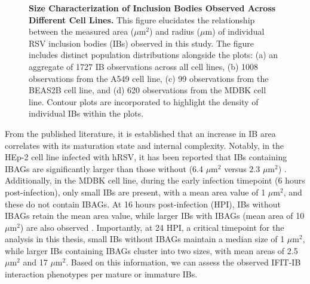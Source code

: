 \begin{figure}
\begin{subfigure}{0.495\textwidth}
    \end{subfigure}
    \caption[Size Characterization of Inclusion Bodies Observed Across Different Cell Lines.]{\textbf{Size Characterization of Inclusion Bodies Observed Across Different Cell Lines.} This figure elucidates the relationship between the measured area (\(\mu \mbox{m}^2\)) and radius (\(\mu \mbox{m}\)) of individual RSV inclusion bodies (IBs) observed in this study. The figure includes distinct population distributions alongside the plots: (a) an aggregate of 1727 IB observations across all cell lines, (b) 1008 observations from the A549 cell line, (c) 99 observations from the BEAS2B cell line, and (d) 620 observations from the MDBK cell line. Contour plots are incorporated to highlight the density of individual IBs within the plots.}
    \label{fig:Size Characterization of Inclusion Bodies Observed Across Different Cell Lines}  
\end{figure}

From the published literature, it is established that an increase in IB area correlates with its maturation state and internal complexity. Notably, in the HEp-2 cell line infected with hRSV, it has been reported that IBs containing IBAGs are significantly larger than those without (6.4 \(\mu \mbox{m}^2\) versus 2.3 \(\mu \mbox{m}^2\)) \cite{Rincheval2017FunctionalVirus}. Additionally, in the MDBK cell line, during the early infection timepoint (6 hours post-infection), only small IBs are present, with a mean area value of 1 \(\mu \mbox{m}^2\), and these do not contain IBAGs. At 16 hours post-infection (HPI), IBs without IBAGs retain the mean area value, while larger IBs with IBAGs (mean area of 10 \(\mu \mbox{m}^2\)) are also observed \cite{Jobe2021BovineResponses}. Importantly, at 24 HPI, a critical timepoint for the analysis in this thesis, small IBs without IBAGs maintain a median size of 1 \(\mu \mbox{m}^2\), while larger IBs containing IBAGs cluster into two sizes, with mean areas of 2.5 \(\mu \mbox{m}^2\) and 17 \(\mu \mbox{m}^2\). Based on this information, we can assess the observed IFIT-IB interaction phenotypes per mature or immature IBs.


